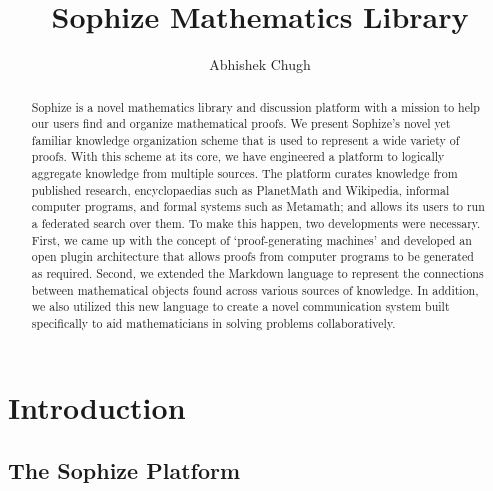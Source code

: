 \documentclass[runningheads]{llncs}
\begin{document}
%
\title{Sophize Mathematics Library}
%
%
\author{Abhishek Chugh}
%
%
%
\maketitle              %
%
\begin{abstract}
Sophize is a novel mathematics library and discussion platform with a mission to help our
users find and organize mathematical proofs. We present Sophize's novel yet familiar
knowledge organization scheme that is used to represent a wide variety of proofs. With this
scheme at its core, we have engineered a platform to logically aggregate knowledge from
multiple sources. The platform curates knowledge from published research, encyclopaedias
such as PlanetMath and Wikipedia, informal computer programs, and formal systems such as
Metamath; and allows its users to run a federated search over them. To make this happen, two
developments were necessary. First, we came up with the concept of `proof-generating
machines' and developed an open plugin architecture that allows proofs from computer
programs to be generated as required. Second, we extended the Markdown language to represent
the connections between mathematical objects found across various sources of knowledge. In
addition, we also utilized this new language to create a novel communication system built
specifically to aid mathematicians in solving problems collaboratively.


\end{abstract}


\section{Introduction}

\subsection{The Sophize Platform}
\end{document}
